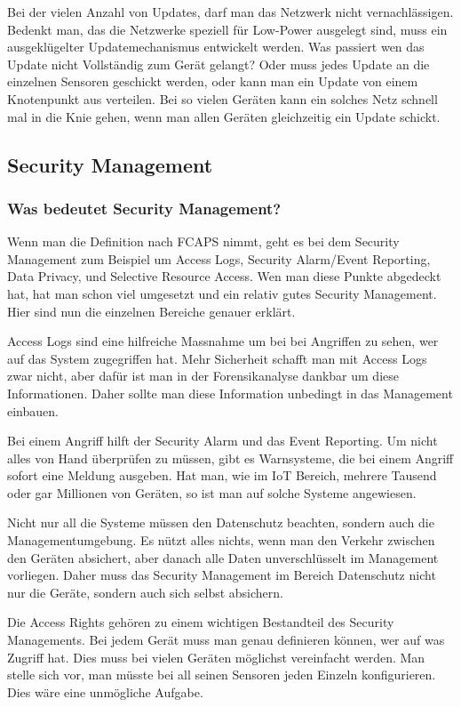 Bei der vielen Anzahl von Updates, darf man das Netzwerk nicht vernachlässigen. Bedenkt man, das die Netzwerke speziell für Low-Power ausgelegt sind, muss ein ausgeklügelter Updatemechanismus entwickelt werden. Was passiert wen das Update nicht Vollständig zum Gerät gelangt? Oder muss jedes Update an die einzelnen Sensoren geschickt werden, oder kann man ein Update von einem Knotenpunkt aus verteilen. Bei so vielen Geräten kann ein solches Netz schnell mal in die Knie gehen, wenn man allen Geräten gleichzeitig ein Update schickt.
\subsection{Security Management}
\subsubsection{Was bedeutet Security Management?}
Wenn man die Definition nach FCAPS nimmt, geht es bei dem Security Management zum Beispiel um Access Logs, Security Alarm/Event Reporting, Data Privacy, und Selective Resource Access. Wen man diese Punkte abgedeckt hat, hat man schon viel umgesetzt und ein relativ gutes Security Management. Hier sind nun die einzelnen Bereiche genauer erklärt.

Access Logs sind eine hilfreiche Massnahme um bei bei Angriffen zu sehen, wer auf das System zugegriffen hat. Mehr Sicherheit schafft man mit Access Logs zwar nicht, aber dafür ist man in der Forensikanalyse dankbar um diese Informationen. Daher sollte man diese Information unbedingt in das Management einbauen. 

Bei einem Angriff hilft der Security Alarm und das Event Reporting. Um nicht alles von Hand überprüfen zu müssen, gibt es Warnsysteme, die bei einem Angriff sofort eine Meldung ausgeben. Hat man, wie im IoT Bereich, mehrere Tausend oder gar Millionen von Geräten, so ist man auf solche Systeme angewiesen.

Nicht nur all die Systeme müssen den Datenschutz beachten, sondern auch die Managementumgebung. Es nützt alles nichts, wenn man den Verkehr zwischen den Geräten absichert, aber danach alle Daten unverschlüsselt im Management vorliegen. Daher muss das Security Management im Bereich Datenschutz nicht nur die Geräte, sondern auch sich selbst absichern.

Die Access Rights gehören zu einem wichtigen Bestandteil des Security Managements. Bei jedem Gerät muss man genau definieren können, wer auf was Zugriff hat. Dies muss bei vielen Geräten möglichst vereinfacht werden. Man stelle sich vor, man müsste bei all seinen Sensoren jeden Einzeln konfigurieren. Dies wäre eine unmögliche Aufgabe.
